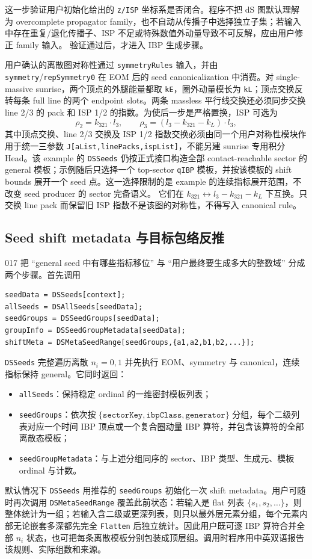 ﻿\documentclass[a4paper,11pt]{article}
\begin{document}
这一步验证用户初始化给出的 \texttt{z/ISP} 坐标系是否闭合。程序不把 dS 图默认理解为 overcomplete propagator family，也不自动从传播子中选择独立子集；若输入中存在重复/退化传播子、ISP 不足或特殊数值外动量导致不可反解，应由用户修正 family 输入。
验证通过后，才进入 IBP 生成步骤。

用户确认的离散图对称性通过 \texttt{symmetryRules} 输入，并由 \texttt{symmetry}/\texttt{repSymmetry0} 在 EOM 后的 seed canonicalization 中消费。对 single-massive sunrise，两个顶点的外腿能量都取 \texttt{kE}，圈外动量模长为 \texttt{kL}；顶点交换反转每条 full line 的两个 endpoint slots。两条 massless 平行线交换还必须同步交换 line 2/3 的 pack 和 ISP 1/2 的指数。为使后一步是严格置换，ISP 可选为
\begin{equation}
 \rho_2=k_{321}\!\cdot l_3,\qquad
 \rho_3=(l_3-k_{321}-k_L)\!\cdot l_3,
\end{equation}
其中顶点交换、line 2/3 交换及 ISP 1/2 指数交换必须由同一个用户对称性模块作用于统一三参数 \texttt{J[aList,linePacks,ispList]}，不能另建 sunrise 专用积分 Head。该 example 的 \texttt{DSSeeds} 仍按正式接口构造全部 contact-reachable sector 的 general 模板；示例随后只选择一个 top-sector \texttt{qIBP} 模板，并按该模板的 shift bounds 展开一个 seed 点。这一选择限制的是 example 的连续指标展开范围，不改变 seed producer 的 sector 完备语义。
它们在 $k_{321}\leftrightarrow l_3-k_{321}-k_L$ 下互换。只交换 line pack 而保留旧 ISP 指数不是该图的对称性，不得写入 canonical rule。

\subsection{Seed shift metadata 与目标包络反推}

017 把 ``general seed 中有哪些指标移位'' 与 ``用户最终要生成多大的整数域'' 分成两个步骤。首先调用
\begin{verbatim}
seedData = DSSeeds[context];
allSeeds = DSAllSeeds[seedData];
seedGroups = DSSeedGroups[seedData];
groupInfo = DSSeedGroupMetadata[seedData];
shiftMeta = DSMetaSeedRange[seedGroups,{a1,a2,b1,b2,...}];
\end{verbatim}

\texttt{DSSeeds} 完整遍历离散 $n_i=0,1$ 并先执行 EOM、symmetry 与 canonical，连续指标保持 general。它同时返回：
\begin{itemize}
  \item \texttt{allSeeds}：保持稳定 ordinal 的一维密封模板列表；
  \item \texttt{seedGroups}：依次按 $\{\texttt{sectorKey},\texttt{ibpClass},\texttt{generator}\}$ 分组，每个二级列表对应一个时间 IBP 顶点或一个复合圈动量 IBP 算符，并包含该算符的全部离散态模板；
  \item \texttt{seedGroupMetadata}：与上述分组同序的 sector、IBP 类型、生成元、模板 ordinal 与计数。
\end{itemize}
默认情况下 \texttt{DSSeeds} 用推荐的 \texttt{seedGroups} 初始化一次 shift metadata。用户可随时再次调用 \texttt{DSMetaSeedRange} 覆盖此前状态：若输入是 flat 列表 $\{s_1,s_2,\ldots\}$，则整体统计为一组；若输入含二级或更深列表，则只以最外层元素分组，每个元素内部无论嵌套多深都先完全 \texttt{Flatten} 后独立统计。因此用户既可逐 IBP 算符合并全部 $n_i$ 状态，也可把每条离散模板分别包装成顶层组。调用时程序用中英双语报告该规则、实际组数和来源。
\end{document}
